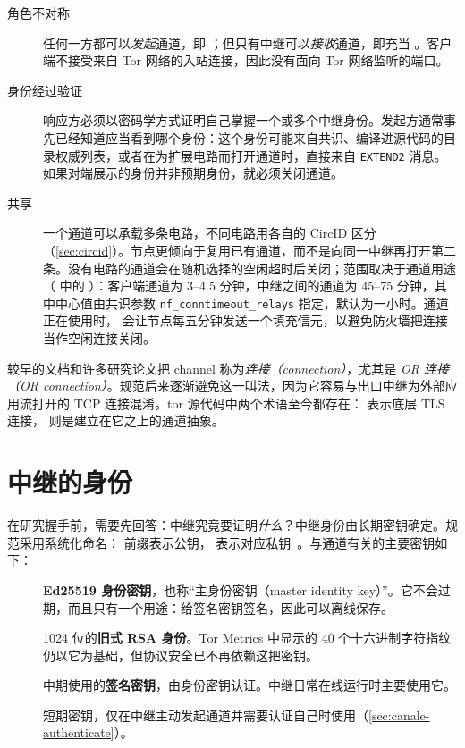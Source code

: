 \begin{description}
  \item[角色不对称] 任何一方都可以\emph{发起}通道，即 ；但只有中继可以\emph{接收}通道，即充当 。客户端不接受来自 Tor 网络的入站连接，因此没有面向 Tor 网络监听的端口。
  \item[身份经过验证] 响应方必须以密码学方式证明自己掌握一个或多个中继身份。发起方通常事先已经知道应当看到哪个身份：这个身份可能来自共识、编译进源代码的目录权威列表，或者在为扩展电路而打开通道时，直接来自 \texttt{EXTEND2} 消息。如果对端展示的身份并非预期身份，就必须关闭通道。
  \item[共享] 一个通道可以承载多条电路，不同电路用各自的 CircID 区分（\cref{sec:circid}）。节点更倾向于复用已有通道，而不是向同一中继再打开第二条。没有电路的通道会在随机选择的空闲超时后关闭；范围取决于通道用途（ 中的 ）：客户端通道为 3--4.5 分钟，中继之间的通道为 45--75 分钟，其中中心值由共识参数 \texttt{nf\_conntimeout\_relays} 指定，默认为一小时。通道正在使用时， 会让节点每五分钟发送一个填充信元，以避免防火墙把连接当作空闲连接关闭。
\end{description}

\begin{approfondimento}[通道还是连接？]
较早的文档和许多研究论文把 channel 称为\emph{连接（connection）}，尤其是 \emph{OR 连接（OR connection）}。规范后来逐渐避免这一叫法，因为它容易与出口中继为外部应用流打开的 TCP 连接混淆。tor 源代码中两个术语至今都存在： 表示底层 TLS 连接， 则是建立在它之上的通道抽象。
\end{approfondimento}

\section{中继的身份}\label{sec:canale-chiavi}

在研究握手前，需要先回答：中继究竟要证明\emph{什么}？中继身份由长期密钥确定。规范采用系统化命名： 前缀表示公钥， 表示对应私钥~。与通道有关的主要密钥如下：

\begin{description}
  \item[] \textbf{Ed25519 身份密钥}，也称\enquote{主身份密钥（master identity key）}。它不会过期，而且只有一个用途：给签名密钥签名，因此可以离线保存。
  \item[] 1024 位的\textbf{旧式 RSA 身份}。Tor Metrics 中显示的 40 个十六进制字符指纹仍以它为基础，但协议安全已不再依赖这把密钥。
  \item[] 中期使用的\textbf{签名密钥}，由身份密钥认证。中继日常在线运行时主要使用它。
  \item[] 短期密钥，仅在中继主动发起通道并需要认证自己时使用（\cref{sec:canale-authenticate}）。
\end{description}

